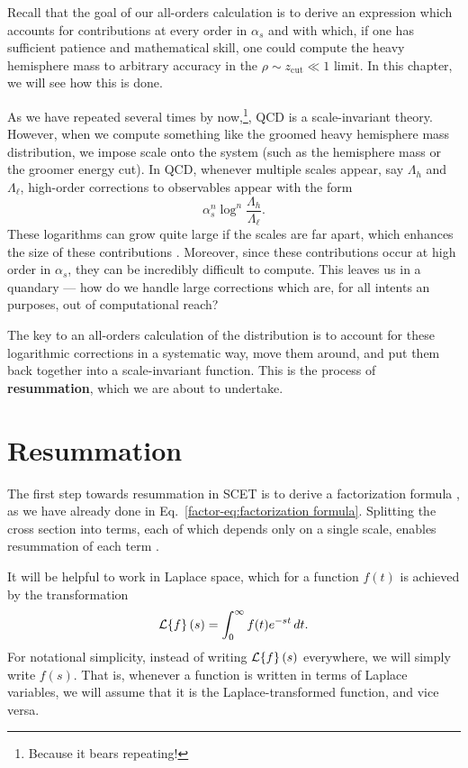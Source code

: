 \documentclass[../thesis.tex]{subfiles}
\providecommand{\zcut}{z_\mathrm{{cut}}}
\providecommand{\cL}{\mathcal{L}}
\begin{document}
	Recall that the goal of our all-orders calculation is to derive an expression which accounts for contributions at every order in $\alpha_s$ and with which, if one has sufficient patience and mathematical skill, one could compute the heavy hemisphere mass to arbitrary accuracy in the $\rho \sim \zcut \ll 1$ limit. In this chapter, we will see how this is done.

	As we have repeated several times by now,\footnote{Because it bears repeating!}, QCD is a scale-invariant theory. However, when we compute something like the groomed heavy hemisphere mass distribution, we impose scale onto the system (such as the hemisphere mass or the groomer energy cut). In QCD, whenever multiple scales appear, say $\Lambda_h$ and $\Lambda_\ell$, high-order corrections to observables appear with the form \cite{becher_introduction_2015-1}
	\begin{equation}
		\alpha_s^n \log^{n}\frac{\Lambda_h}{\Lambda_\ell}.
	\end{equation}
	These logarithms can grow quite large if the scales are far apart, which enhances the size of these contributions \cite{schwartz_quantum_2014}. Moreover, since these contributions occur at high order in $\alpha_s$, they can be incredibly difficult to compute. This leaves us in a quandary --- how do we handle large corrections which are, for all intents an purposes, out of computational reach?

	The key to an all-orders calculation of the distribution is to account for these logarithmic corrections in a systematic way, move them around, and put them back together into a scale-invariant function. This is the process of \textbf{resummation}, which we are about to undertake.

\section{Resummation}\label{all-sec:resummation}
	The first step towards resummation in SCET is to derive a factorization formula \cite{becher_introduction_2015-1}, as we have already done in Eq.~\ref{factor-eq:factorization formula}. Splitting the cross section into terms, each of which depends only on a single scale, enables resummation of each term \cite{frye_factorization_2016}.

	It will be helpful to work in Laplace space, which for a function $f(t)$ is achieved by the transformation \cite{boas_mathematical_2006}
	\begin{equation}
		\cL\qty{f}(s) = \int_0^\infty f(t) e^{-st}\,dt.
	\end{equation}
	For notational simplicity, instead of writing $\cL\qty{f}(s)$ everywhere, we will simply write $f(s)$. That is, whenever a function is written in terms of Laplace variables, we will assume that it is the Laplace-transformed function, and vice versa.
\end{document}
